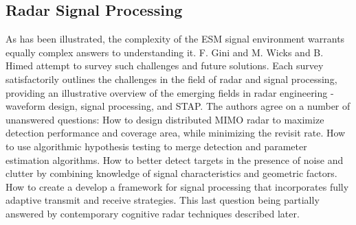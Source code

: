 
\subsection{Radar Signal Processing}
As has been illustrated, the complexity of the \ac{ESM} signal environment warrants equally complex answers to understanding it.
F. Gini \cite{gini_grand_2021} and M. Wicks and B. Himed \cite{wicks_four_2004} attempt to survey such challenges and future solutions. 
Each survey satisfactorily outlines the challenges in the field of radar and signal processing, providing an illustrative overview of the emerging fields in radar engineering - waveform design, signal processing, and \ac{STAP}.
The authors agree on a number of unanswered questions:
How to design distributed \ac{MIMO} radar to maximize detection performance and coverage area, while minimizing the revisit rate.
How to use algorithmic hypothesis testing to merge detection and parameter estimation algorithms.
How to better detect targets in the presence of noise and clutter by combining knowledge of signal characteristics and geometric factors.
How to create a develop a framework for signal processing that incorporates fully adaptive transmit and receive strategies.
This last question being partially answered by contemporary cognitive radar techniques described later.

